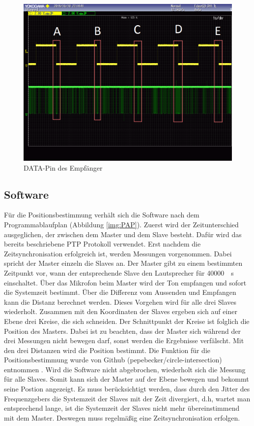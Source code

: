 \begin{figure}[H]
\centering
\hspace*{-1.7cm}
\includegraphics[width=1.2\textwidth]{images/schmitt_trigger_billig_sender_bearbeitet.png}
\caption{\si{DATA}-Pin des \funkempfaenger \platz Empfänger}
\label{img:ausgang_sender_pin}
\end{figure}

\subsection{Software}
Für die Positionsbestimmung verhält sich die Software nach dem Programmablaufplan (Abbildung \ref{img:PAP}). Zuerst wird der Zeitunterschied ausgeglichen, der zwischen dem Master und dem Slave besteht. Dafür wird das bereits beschriebene PTP Protokoll verwendet. Erst nachdem die Zeitsynchronisation erfolgreich ist, werden Messungen vorgenommen. Dabei spricht der Master einzeln die Slaves an. Der Master gibt zu einem bestimmten Zeitpunkt vor, wann der entsprechende Slave den Lautsprecher für \SI{40000}{\mu\s} einschaltet. Über das Mikrofon beim Master wird der Ton empfangen und sofort die Systemzeit bestimmt. Über die Differenz vom Aussenden und Empfangen kann die Distanz berechnet werden. Dieses Vorgehen wird für alle drei Slaves wiederholt. Zusammen mit den Koordinaten der Slaves ergeben sich auf einer Ebene drei Kreise, die sich schneiden. Der Schnittpunkt der Kreise ist folglich die Position des Masters. Dabei ist zu beachten, dass der Master sich während der drei Messungen nicht bewegen darf, sonst werden die Ergebnisse verfälscht. Mit den drei Distanzen wird die Position bestimmt. Die Funktion für die Positionsbestimmung wurde von Github (pepebecker/circle-intersection) entnommen \cite{src_GITHUB_CODE}. Wird die Software nicht abgebrochen, wiederholt sich die Messung für alle Slaves. Somit kann sich der Master auf der Ebene bewegen und bekommt seine Postion angezeigt. Es muss berücksichtigt werden, dass durch den Jitter des Frequenzgebers die Systemzeit der Slaves mit der Zeit divergiert, d.h, wartet man entsprechend lange, ist die Systemzeit der Slaves nicht mehr übereinstimmend mit dem Master. Deswegen muss regelmäßig eine Zeitsynchronisation erfolgen.

